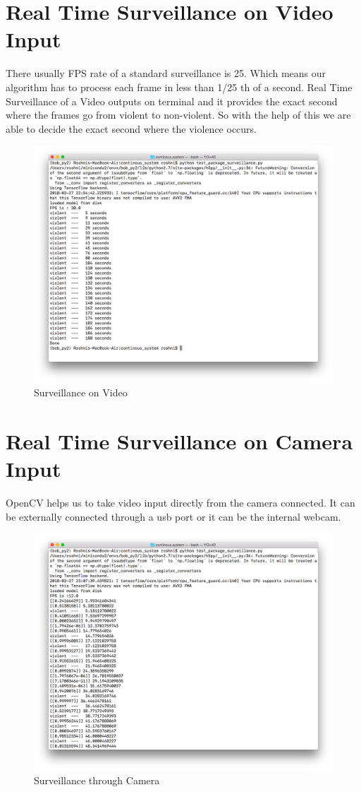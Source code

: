 \section{Real Time Surveillance on Video Input}
There usually FPS rate of a standard surveillance is 25. Which means our algorithm has to process each frame in less than 1/25 th of a second. Real Time Surveillance of a Video outputs on terminal and it provides the exact second where the frames go from violent to non-violent. So with the help of this we are able to decide the exact second where the violence occurs. 
\begin{figure}[H]
\centering
\includegraphics[width = \linewidth]{video_surveillance_output.png}
\caption{Surveillance on Video}
\end{figure}
\section{Real Time Surveillance on Camera Input}
OpenCV helps us to take video input directly from the camera connected. It can be externally connected through a usb port or it can be the internal webcam.
\begin{figure}[H]
\centering
\includegraphics[width = \linewidth]{camera_surveillance_output.png}
\caption{Surveillance through Camera}
\end{figure}
